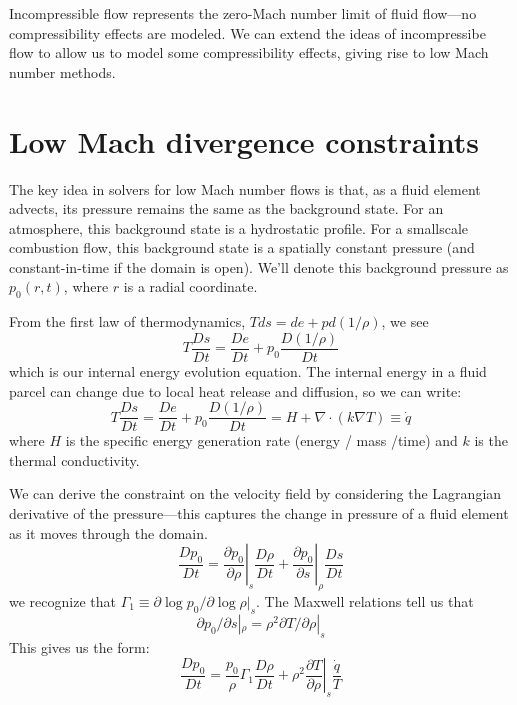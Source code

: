\newcommand{\teta}{\tilde{\eta}}

Incompressible flow represents the zero-Mach number limit of fluid
flow---no compressibility effects are modeled.  We can extend the
ideas of incompressibe flow to allow us to model some compressibility
effects, giving rise to low Mach number methods.

\section{Low Mach divergence constraints}
\label{ch:lm:constraints}

The key idea in solvers for low Mach number flows is that, as a fluid
element advects, its pressure remains the same as the background
state.  For an atmosphere, this background state is a hydrostatic
profile.  For a smallscale combustion flow, this background state is a
spatially constant pressure (and constant-in-time if the domain is
open).  We'll denote this background pressure as $p_0(r,t)$, where 
$r$ is a radial coordinate.

From the first law of thermodynamics, $Tds = de + pd(1/\rho)$, we see
\begin{equation}
T \frac{Ds}{Dt} = \frac{De}{Dt} + p_0 \frac{D(1/\rho)}{Dt}
\end{equation}
which is our internal energy evolution equation.  The internal
energy in a fluid parcel can change due to local heat release and 
diffusion, so we can write:
\begin{equation}
T \frac{Ds}{Dt} = \frac{De}{Dt} + p_0 \frac{D(1/\rho)}{Dt} = H +
\nabla \cdot (k \nabla T) \equiv \dot{q}
\end{equation}
where $H$ is the specific energy generation rate (energy / mass /time)
and $k$ is the thermal conductivity.

We can derive the constraint on the velocity field by considering the
Lagrangian derivative of the pressure---this captures the change in
pressure of a fluid element as it moves through the domain.
\begin{equation}
\frac{Dp_0}{Dt} = \left . \frac{\partial p_0}{\partial \rho} \right |_s
     \frac{D\rho}{Dt} +
     \left . \frac{\partial p_0}{\partial s} \right |_\rho
     \frac{Ds}{Dt}
\end{equation}
we recognize that $\Gamma_1 \equiv \partial \log p_0/\partial \log \rho |_s$.
The Maxwell relations tell us that
\begin{equation}
\partial p_0/\partial s |_\rho = \rho^2 \partial T/\partial \rho |_s
\end{equation}
This gives us the form:
\begin{equation}
\frac{Dp_0}{Dt} = \frac{p_0}{\rho} \Gamma_1 \frac{D\rho}{Dt} +
     \left . \rho^2 \frac{\partial T}{\partial \rho} \right |_s
     \frac{\dot{q}}{T}
\end{equation}


